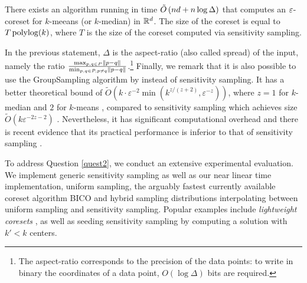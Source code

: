 \begin{theorem}\label{thm:main}
There exists an algorithm running in time $\tilde O\left( nd + n \log \Delta\right)$  that computes an $\varepsilon$-coreset for $k$-meeans (or $k$-median) in $\mathbb{R}^d$. The size of the coreset is equal to $T \operatorname{polylog}(k)$, where $T$ is the size of the coreset computed via sensitivity sampling.
\end{theorem}
In the previous statement, $\Delta$ is the aspect-ratio (also called spread) of the input, namely the ratio $\frac{\max_{p, q \in P} \left\| p-q\right\|}{\min_{p, q \in P, p \neq q} \left\| p-q\right\|}$.\footnote{The aspect-ratio corresponds to the precision of the data points: to write in binary the coordinates of a data point, $O(\log \Delta)$ bits are required.}
Finally, we remark that it is also possible to use the GroupSampling algorithm by \cite{CSS21} instead of sensitivity sampling. It has a better theoretical bound of  $\tilde{O}(k\cdot \varepsilon^{-2} \min(k^{z/(z+2)},\varepsilon^{-z}))$, where $z=1$ for $k$-median and $2$ for $k$-means \cite{CLSSS22}, compared to sensitivity sampling which achieves size $\tilde{O}(k\varepsilon^{-2z-2})$ \cite{HuangV20}. Nevertheless, it has significant computational overhead and there is recent evidence that its practical performance is inferior to that of sensitivity sampling \cite{chrisESA}. 

%


To address Question \ref{quest2}, we conduct an extensive experimental evaluation.
We implement generic sensitivity sampling as well as our near linear time implementation, uniform sampling, the arguably fastest currently available coreset algorithm BICO \cite{bico} and hybrid sampling distributions interpolating between uniform sampling and sensitivity sampling. Popular examples include \emph{lightweight coresets} \cite{bachem2018scalable}, as well as seeding sensitivity sampling by computing a solution with $k'<k$ centers.

